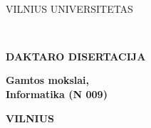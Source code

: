 \newpage
\thispagestyle{empty}                   %
{\selectfont
\linespread{1.15}\selectfont
\renewcommand\bfdefault{m}
\begin{flushright}
    \thesisDOI \\
    \thesisORCID
\end{flushright}

\begin{center}
	\vspace*{5mm}	
	\begin{flushleft}
         \fontsize{12}{12}\selectfont
	       VILNIUS UNIVERSITETAS \\
	\end{flushleft}
 
	\vspace{50mm}
	\begin{flushleft}
	   {\fontsize{15}{15}\selectfont  \thesisAuthorName \  \thesisAuthorSurname \par}
    \end{flushleft}

	\vspace{10mm}
	\begin{flushleft}
    	{ \fontsize{21}{21}\selectfont
    	   \thesisTitleLT \par
    	}
    \end{flushleft}

    \vspace{50mm minus 45mm}
    \begin{flushleft}
        \renewcommand\bfdefault{b}
        \fontsize{12}{12}\selectfont
        {\bf DAKTARO DISERTACIJA}\\ 
    \end{flushleft}
    
    \vspace{5mm}
    \begin{flushleft}
        \renewcommand\bfdefault{m}
        \fontsize{12}{12}\selectfont
        \bf
            Gamtos mokslai, \\ %
            Informatika (N 009)  %
    \end{flushleft}
    
    \vspace{6mm}
    \begin{flushleft} 
         \fontsize{9}{9}\selectfont
        \bf VILNIUS \thesisYear
    \end{flushleft} 
\end{center}
}

